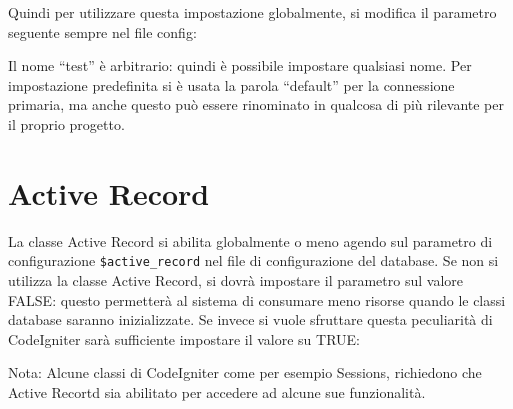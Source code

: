 Quindi per utilizzare questa impostazione globalmente, si modifica il parametro seguente sempre nel file config:


Il nome ``test'' è arbitrario: quindi è possibile impostare qualsiasi nome. Per impostazione predefinita si è usata la parola ``default'' per la connessione primaria, ma anche questo può essere rinominato in qualcosa di più rilevante per il proprio progetto.

\section*{Active Record}
La classe Active Record si abilita globalmente o meno agendo sul parametro di configurazione \verb|$active_record| nel file di configurazione del database. Se non si utilizza la classe Active Record, si dovrà impostare il parametro sul valore FALSE: questo permetterà al sistema di consumare meno risorse quando le classi database saranno inizializzate. Se invece si vuole sfruttare questa peculiarità di CodeIgniter sarà sufficiente impostare il valore su TRUE:


Nota: Alcune classi di CodeIgniter come per esempio Sessions, richiedono che Active Recortd sia abilitato per accedere ad alcune sue funzionalità.


